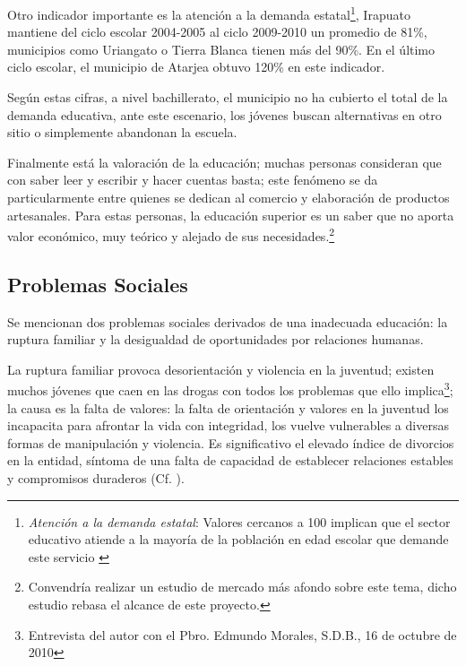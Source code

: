 





Otro indicador importante es la atención a la demanda estatal\footnote{\emph{Atención a la demanda estatal}: Valores cercanos a 100 implican que el sector educativo atiende a la mayoría de la población en edad escolar que demande este servicio \citep{Seg2010}}, Irapuato mantiene del ciclo escolar 2004-2005 al ciclo 2009-2010 un promedio de 81\%, municipios como Uriangato o Tierra Blanca tienen más del 90\%. En el último ciclo escolar, el municipio de Atarjea obtuvo 120\% en este indicador.

Según estas cifras, a nivel bachillerato, el municipio no ha cubierto el total de la demanda educativa, ante este escenario, los jóvenes buscan alternativas en otro sitio o simplemente abandonan la escuela.

Finalmente está la valoración de la educación; muchas personas consideran que con saber leer y escribir y hacer cuentas basta; este fenómeno se da particularmente entre quienes se dedican al comercio y elaboración de productos artesanales. Para estas personas, la educación superior es un saber que no aporta valor económico, muy teórico y alejado de sus necesidades.\footnote{Convendría realizar un estudio de mercado más afondo sobre este tema, dicho estudio rebasa el alcance de este proyecto.}



\subsection{Problemas Sociales}

Se mencionan dos problemas sociales derivados de una inadecuada educación: la ruptura familiar y la desigualdad de oportunidades por relaciones humanas.

La ruptura familiar provoca desorientación y violencia en la juventud; existen muchos j\'ovenes que caen en las drogas con todos los problemas que ello implica\footnote{Entrevista del autor con el Pbro. Edmundo Morales, S.D.B., 16 de octubre de 2010}; la causa es la falta de valores: la falta de orientación y valores en la juventud los incapacita para afrontar la vida con integridad, los vuelve vulnerables a diversas formas de manipulación y violencia. Es significativo el elevado índice de divorcios en la entidad, síntoma de una falta de capacidad de establecer relaciones estables y compromisos duraderos (Cf. \citep{Morales09}).


